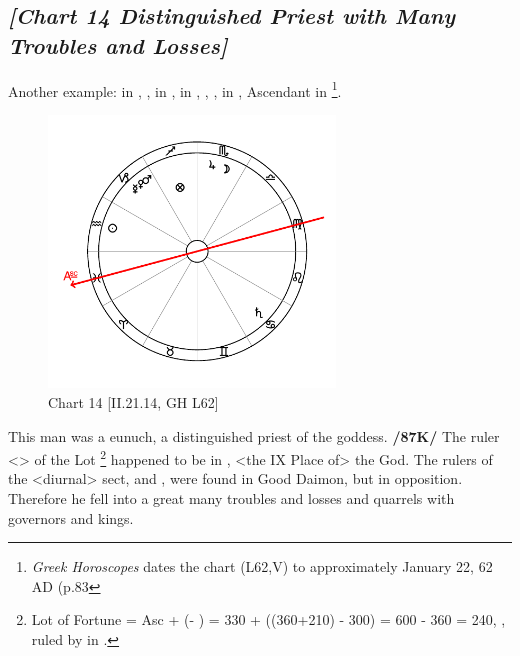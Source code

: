 \newpage
\subsection*{\textit{[Chart 14 Distinguished Priest with Many Troubles and Losses]}}

Another example: \Sun\xspace in \Aquarius, \Moon, \Jupiter\xspace in \Scorpio, \Saturn\xspace in \Cancer, \Mars, \Venus, \Mercury\xspace in \Capricorn, Ascendant in \Pisces
\footnote{\textit{Greek Horoscopes} dates the chart (L62,V) to approximately January 22, 62 AD (p.83}.

\clearpage
\begin{figure}
\centering
\vspace{-20pt}
\includegraphics[width=0.68\textwidth]{charts/2_21_14}
\caption{Chart 14 [II.21.14, GH L62]}
\label{fig:chart14}
\end{figure}

This man was a eunuch, a distinguished priest of the goddess. \textbf{/87K/} The ruler <\Jupiter> of the Lot
\footnote{Lot of Fortune = Asc + (\Moon\xspace\xspace - \Sun) = 330 + ((360+210) - 300) = 600 - 360 = 240, \Sagittarius, ruled by \Jupiter\xspace in \Scorpio.}
 happened to be in \Scorpio, <the IX Place of> the God. The rulers of the <diurnal> sect, \Saturn\xspace and \Mercury, were found in Good Daimon, but in opposition. Therefore he fell into a great many troubles and losses and quarrels with governors and kings.

\newpage